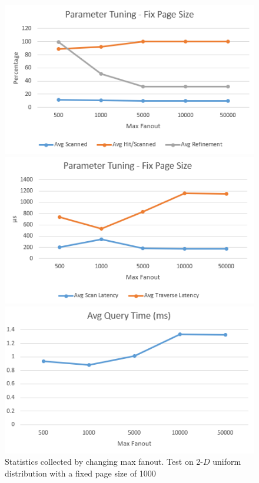 \documentclass[sigconf,10pt]{acmart}
\begin{document}
\begin{figure}[ht] 
  \label{parameter-fix-pageSize} 
  \begin{minipage}[b]{0.33\linewidth}
    \centering
    \includegraphics[width=.8\linewidth]{../figures/parameter/fix-pagesize-hit} 
    \vspace{4ex}
  \end{minipage}%
  \begin{minipage}[b]{0.33\linewidth}
    \centering
    \includegraphics[width=.8\linewidth]{../figures/parameter/fix-pagesize-latency} 
    \vspace{4ex}
  \end{minipage}%
  \begin{minipage}[b]{0.33\linewidth}
    \centering
    \includegraphics[width=.8\linewidth]{../figures/parameter/fix-pagesize-qtime} 
    \vspace{4ex}
  \end{minipage}
  \caption{Statistics collected by changing max fanout. Test on 2-$D$ uniform distribution
  with a fixed page size of 1000}
\end{figure}
\end{document}
